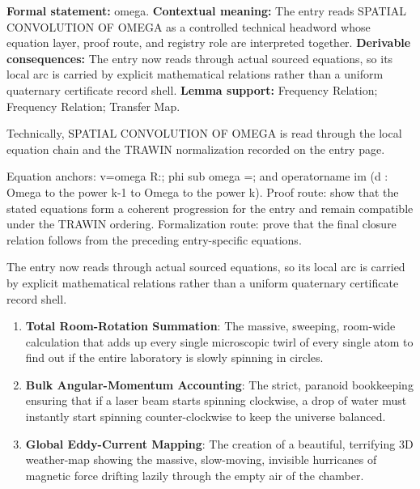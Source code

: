 \begingroup\footnotesize\setlength{\emergencystretch}{3em}\sloppy
\textbf{Formal statement:} omega. \textbf{Contextual meaning:} The entry reads SPATIAL CONVOLUTION OF OMEGA as a controlled technical headword whose equation layer, proof route, and registry role are interpreted together. \textbf{Derivable consequences:} The entry now reads through actual sourced equations, so its local arc is carried by explicit mathematical relations rather than a uniform quaternary certificate record shell. \textbf{Lemma support:} Frequency Relation; Frequency Relation; Transfer Map.\par
\endgroup

Technically, SPATIAL CONVOLUTION OF OMEGA is read through the local equation chain and the TRAWIN normalization recorded on the entry page.

Equation anchors: v=omega R:; phi sub omega =; and operatorname im (d : Omega to the power k-1 to Omega to the power k). Proof route: show that the stated equations form a coherent progression for the entry and remain compatible under the TRAWIN ordering. Formalization route: prove that the final closure relation follows from the preceding entry-specific equations.

The entry now reads through actual sourced equations, so its local arc is carried by explicit mathematical relations rather than a uniform quaternary certificate record shell.
\endgroup

\begin{enumerate}[leftmargin=1.6em,itemsep=6pt,topsep=4pt]
\item \textbf{Total Room-Rotation Summation}: The massive, sweeping, room-wide calculation that adds up every single microscopic twirl of every single atom to find out if the entire laboratory is slowly spinning in circles.
\item \textbf{Bulk Angular-Momentum Accounting}: The strict, paranoid bookkeeping ensuring that if a laser beam starts spinning clockwise, a drop of water must instantly start spinning counter-clockwise to keep the universe balanced.
\item \textbf{Global Eddy-Current Mapping}: The creation of a beautiful, terrifying 3D weather-map showing the massive, slow-moving, invisible hurricanes of magnetic force drifting lazily through the empty air of the chamber.
\end{enumerate}

